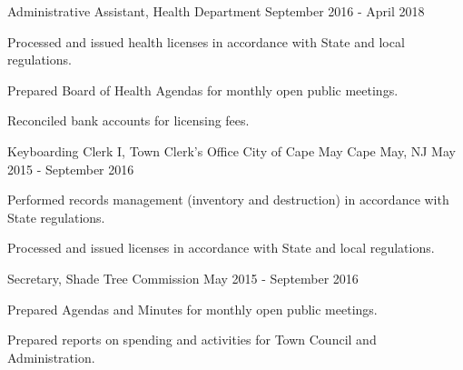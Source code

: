 \begin{cventries}
  \cventry
    {Administrative Assistant, Health Department} %
    {} %
    {} %
    {September 2016 - April 2018} %
    {
      \begin{cvitems} %
        \item {Processed and issued health licenses in accordance with State and local regulations.}
        \item {Prepared Board of Health Agendas for monthly open public meetings.}
        \item {Reconciled bank accounts for licensing fees.}
      \end{cvitems}
    }

  \cventry
    {Keyboarding Clerk I, Town Clerk’s Office} %
    {City of Cape May} %
    {Cape May, NJ} %
    {May 2015 - September 2016} %
    {
      \begin{cvitems} %
        \item {Performed records management (inventory and destruction) in accordance with State regulations.}
        \item {Processed and issued licenses in accordance with State and local regulations.}
      \end{cvitems}
    }

  \cventry
    {Secretary, Shade Tree Commission} %
    {} %
    {} %
    {May 2015 - September 2016} %
    {
      \begin{cvitems} %
        \item {Prepared Agendas and Minutes for monthly open public meetings.}
        \item {Prepared reports on spending and activities for Town Council and Administration.}
      \end{cvitems}
    }


\end{cventries}
